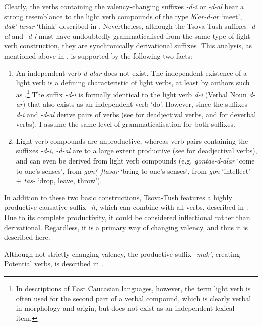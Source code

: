Clearly, the verbs containing the valency-changing suffixes \textit{-d-i} or \textit{-d-al} bear a strong resemblance to the light verb compounds of the type \textit{bʕar-d-ar} `meet', \textit{dak'-lavar} `think' described in . Nevertheless, although the Tsova-Tush suffixes \textit{-d-al} and \textit{-d-i} must have undoubtedly grammaticalised from the same type of light verb construction, they are synchronically derivational suffixes. This analysis, as mentioned above in , is supported by the following two facts:

\begin{enumerate}
\item An independent verb \textit{d-alar} does not exist. The independent existence of a light verb is a defining characteristic of light verbs, at least by authors such as \textcite[106]{wohlgemut09loanverbtyp}.\footnote{In descriptions of East Caucasian languages, however, the term light verb is often used for the second part of a verbal compound, which is clearly verbal in morphology and origin, but does not exist as an independent lexical item.} The suffix \textit{-d-i} is formally identical to the light verb \textit{d-i} (Verbal Noun \textit{d-ar}) that also exists as an independent verb `do'. However, since the suffixes \textit{-d-i} and \textit{-d-al} derive pairs of verbs (see  for deadjectival verbs, and  for deverbal verbs), I assume the same level of grammaticalisation for both suffixes.

\item Light verb compounds are unproductive, whereas verb pairs containing the suffixes \textit{-d-i, -d-al} are to a large extent productive (see  for deadjectival verbs), and can even be derived from light verb compounds (e.g. \textit{gontas-d-alar} `come to one's senses', from \textit{gon(-)tasar} `bring to one's senses', from \textit{gon} `intellect' + \textit{tas-} `drop, leave, throw').
\end{enumerate}

In addition to these two basic constructions, Tsova-Tush features a highly productive causative suffix \textit{-it}, which can combine with all verbs, described in . Due to its complete productivity, it could be considered inflectional rather than derivational. Regardless, it is a primary way of changing valency, and thus it is described here.

Although not strictly changing valency, the productive suffix \textit{-mak'}, creating Potential verbs, is described in .


